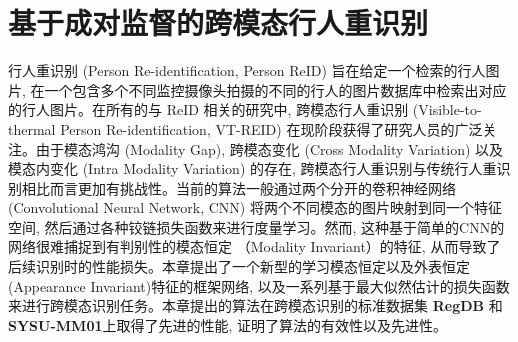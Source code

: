 \chapter{基于成对监督的跨模态行人重识别}
行人重识别 (Person Re-identification, Person ReID) 旨在给定一个检索的行人图片, 在一个包含多个不同监控摄像头拍摄的不同的行人的图片数据库中检索出对应的行人图片。在所有的与 ReID 相关的研究中, 跨模态行人重识别 (Visible-to-thermal Person Re-identification, VT-REID) 在现阶段获得了研究人员的广泛关注。由于模态鸿沟 (Modality Gap), 跨模态变化 (Cross Modality Variation) 以及模态内变化 (Intra Modality Variation) 的存在, 跨模态行人重识别与传统行人重识别相比而言更加有挑战性。当前的算法一般通过两个分开的卷积神经网络 (Convolutional Neural Network, CNN) 将两个不同模态的图片映射到同一个特征空间, 然后通过各种铰链损失函数来进行度量学习。然而, 这种基于简单的CNN的网络很难捕捉到有判别性的模态恒定 （Modality Invariant）的特征, 从而导致了后续识别时的性能损失。本章提出了一个新型的学习模态恒定以及外表恒定 (Appearance Invariant)特征的框架网络, 以及一系列基于最大似然估计的损失函数来进行跨模态识别任务。本章提出的算法在跨模态识别的标准数据集 \textbf{RegDB} 和 \textbf{SYSU-MM01}上取得了先进的性能, 证明了算法的有效性以及先进性。
